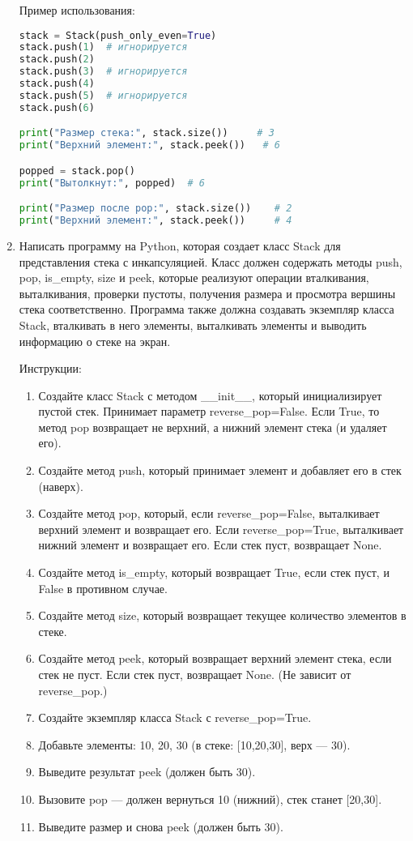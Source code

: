 \begin{enumerate}
Пример использования:
\begin{lstlisting}[language=Python]
stack = Stack(push_only_even=True)
stack.push(1)  # игнорируется
stack.push(2)
stack.push(3)  # игнорируется
stack.push(4)
stack.push(5)  # игнорируется
stack.push(6)

print("Размер стека:", stack.size())     # 3
print("Верхний элемент:", stack.peek())   # 6

popped = stack.pop()
print("Вытолкнут:", popped)  # 6

print("Размер после pop:", stack.size())    # 2
print("Верхний элемент:", stack.peek())     # 4
\end{lstlisting}

\item Написать программу на Python, которая создает класс Stack для представления стека с инкапсуляцией. Класс должен содержать методы push, pop, is\_empty, size и peek, которые реализуют операции вталкивания, выталкивания, проверки пустоты, получения размера и просмотра вершины стека соответственно. Программа также должна создавать экземпляр класса Stack, вталкивать в него элементы, выталкивать элементы и выводить информацию о стеке на экран.

Инструкции:
\begin{enumerate}
    \item Создайте класс Stack с методом \_\_init\_\_, который инициализирует пустой стек. Принимает параметр reverse\_pop=False. Если True, то метод pop возвращает не верхний, а нижний элемент стека (и удаляет его).
    \item Создайте метод push, который принимает элемент и добавляет его в стек (наверх).
    \item Создайте метод pop, который, если reverse\_pop=False, выталкивает верхний элемент и возвращает его. Если reverse\_pop=True, выталкивает нижний элемент и возвращает его. Если стек пуст, возвращает None.
    \item Создайте метод is\_empty, который возвращает True, если стек пуст, и False в противном случае.
    \item Создайте метод size, который возвращает текущее количество элементов в стеке.
    \item Создайте метод peek, который возвращает верхний элемент стека, если стек не пуст. Если стек пуст, возвращает None. (Не зависит от reverse\_pop.)
    \item Создайте экземпляр класса Stack с reverse\_pop=True.
    \item Добавьте элементы: 10, 20, 30 (в стеке: [10,20,30], верх — 30).
    \item Выведите результат peek (должен быть 30).
    \item Вызовите pop — должен вернуться 10 (нижний), стек станет [20,30].
    \item Выведите размер и снова peek (должен быть 30).
\end{enumerate}


\end{enumerate}
